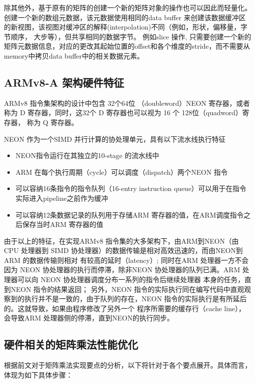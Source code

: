 除其他外，基于原有的矩阵的创建一个新的矩阵对象的操作也可以因此而轻量化。创建一个新的数组元数据，该元数据使用相同的data
buffer 来创建该数据缓冲区的新视图，该视图对缓冲区的解释(interpolation)不同（例如，形状，偏移量，字节顺序， 大步等），但共享相同的数据字节。 例如slice 操作,
只需要创建一个新的矩阵元数据信息，对应的更改其起始位置的offset和各个维度的stride，而不需要从memory中拷贝data buffer中的相关数据元素。

\subsection{ARMv8-A 架构硬件特征}
\label{sec:hwchar}

ARMv8 指令集架构的设计中包含 32个64位 （doubleword）NEON 寄存器，或者称为 D 寄存器，同时，这32个 D 寄存器也可以视为 16 个 128位（quadword）寄存器，
称为 Q 寄存器。

NEON 作为一个SIMD 并行计算的协处理单元，具有以下流水线执行特征
\begin{itemize}
\item NEON指令运行在其独立的10-stage 的流水线中
\item ARM 在每个执行周期（cycle）可以调度（dispatch）两个NEON 指令
\item 可以容纳16条指令的指令队列（16-entry instruction queue）可以用于在指令实际进入pipeline之前作为缓冲
\item 可以容纳12条数据记录的队列用于存储ARM 寄存器的值，在ARM调度指令之后保存当时ARM 寄存器的值
\end{itemize}

由于以上的特征，在实现ARMv8 指令集的大多架构下，由ARM到NEON（由CPU 处理器到 SIMD 协处理器）的数据传输是相对高效迅速的，而由NEON到ARM 的数据传输则相对
有较高的延时（latency）;
同时在ARM 处理器一方不会因为 NEON 协处理器的执行而停滞，除非NEON 协处理器的队列已满。ARM 处理器可以向 NEON 协处理器调度分布一系列的指令后继续处理器
本身的任务，直到NEON 指令的结果返回；
另外，NEON 指令的实际执行同在编写代码中直观观察到的执行并不是一致的，由于队列的存在，NEON 指令的实际执行是有所延后的。这就导致，如果由程序修改了另外一个
程序所需要的缓存行（cache line），会导致ARM 处理器侧的停滞，直到NEON的执行同步。

\subsection{硬件相关的矩阵乘法性能优化}
\label{sec:matrix-mul}

根据前文对于矩阵乘法实现要点的分析，以下将针对于各个要点展开。具体而言，体现为如下具体步骤：

